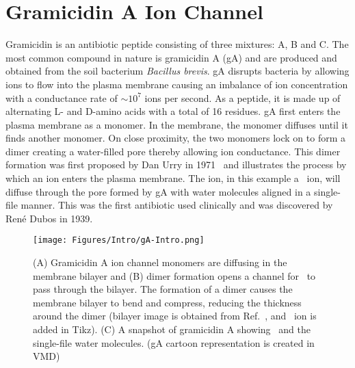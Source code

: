 \section{Gramicidin A Ion Channel}
Gramicidin is an antibiotic peptide consisting of three mixtures: A, B and C. The most common 
compound in nature is gramicidin A (gA) and are produced and obtained from the soil bacterium 
\textit{Bacillus brevis}. gA disrupts bacteria by allowing ions to flow into the plasma membrane 
causing an imbalance of ion concentration with a conductance rate of ${\sim}10^7$ ions per second. 
As a peptide, it is made up of alternating L- and D-amino acids with a total of 16 residues. gA 
first enters the plasma membrane as a monomer. In the membrane, the monomer diffuses until it 
finds another monomer. On close proximity, the two monomers lock on to form a dimer creating a 
water-filled pore thereby allowing ion conductance. This dimer formation was first proposed by Dan 
Urry in 1971~\cite{Urry1971} and  illustrates the process by which an ion 
enters the plasma membrane. The ion, in this example a \K\ ion, will diffuse through the pore 
formed by gA with water molecules aligned in a single-file manner. This was the first antibiotic 
used clinically and was discovered by Ren\'{e} Dubos in 1939.

\begin{figure}[b!]
\centering
\texttt{[image: Figures/Intro/gA-Intro.png]}
\caption{(A) Gramicidin A ion channel monomers are diffusing in the membrane bilayer and (B) 
dimer formation opens a channel for \K\ to pass through the bilayer. The formation of a 
dimer causes the membrane bilayer to bend and compress, reducing the thickness around the 
dimer (bilayer image is obtained from Ref.~\cite{Lundbaek2010}, and \K\ ion is added in 
Tikz). (C) A snapshot of gramicidin A showing \K\ and the single-file water molecules. 
(gA cartoon representation is created in VMD)}
\label{intro:gAIntro}
\end{figure}

